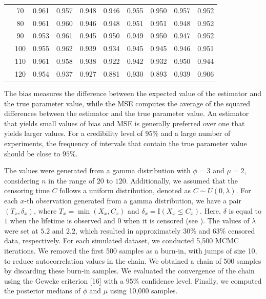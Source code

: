 \documentclass[12pt]{article} %
\theoremstyle{plain}%
\theoremstyle{definition}
\theoremstyle{remark}
\begin{document}
\begin{table}[!h]
{\begin{tabular}{c|c|c|c|c|c|c|c|c|c}
&  70 & 0.961 & 0.957 & 0.948 & 0.946 & 0.955 & 0.950 & 0.957 & 0.952 \\
&  80 & 0.961 & 0.960 & 0.946 & 0.948 & 0.951 & 0.951 & 0.948 & 0.952 \\
&  90 & 0.953 & 0.961 & 0.945 & 0.950 & 0.949 & 0.950 & 0.947 & 0.952 \\
&  100 & 0.955 & 0.962 & 0.939 & 0.934 & 0.945 & 0.945 & 0.946 & 0.951 \\
&  110 & 0.961 & 0.958 & 0.938 & 0.922 & 0.942 & 0.932 & 0.950 & 0.944 \\
&  120 & 0.954 & 0.937 & 0.927 & 0.881 & 0.930 & 0.893 & 0.939 & 0.906 \\ \hline
\hline
\end{tabular}}
\label{tableres2}
\end{table}

The bias measures the difference between the expected value of the estimator and the true parameter value, while the MSE computes the average of the squared differences between the estimator and the true parameter value. An estimator that yields small values of bias and MSE is generally preferred over one that yields larger values. %
For a credibility level of $95\%$ and a large number of experiments, the frequency of intervals that contain the true parameter value should be close to $95\%$. 

The values were generated from a gamma distribution with $\phi=3$ and $\mu=2$, considering $n$ in the range of $20$ to $120$. Additionally, we assumed that the censoring time $C$ follows a uniform distribution, denoted as $C \sim U(0,\lambda)$. For each $x$-th observation generated from a gamma distribution, we have a pair $(T_x, \delta_x)$, where $T_x = \min (X_x, C_x)$ and $\delta_x = \mathrm{I}(X_x \leq C_x)$. Here, $\delta$ is equal to $1$ when the lifetime is observed and $0$ when it is censored (see \cite{ramos2020sampling}). The values of $\lambda$ were set at $5.2$ and $2.2$, which resulted in approximately $30\%$ and $63\%$ censored data, respectively. For each simulated dataset, we conducted 5,500 MCMC iterations. We removed the first 500 samples as a burn-in, with jumps of size 10, to reduce autocorrelation values in the chain. We obtained a chain of 500 samples by discarding these burn-in samples. We evaluated the convergence of the chain using the Geweke criterion [16] with a $95\%$ confidence level. Finally, we computed the posterior medians of $\phi$ and $\mu $ using 10,000 samples.
\end{document}
